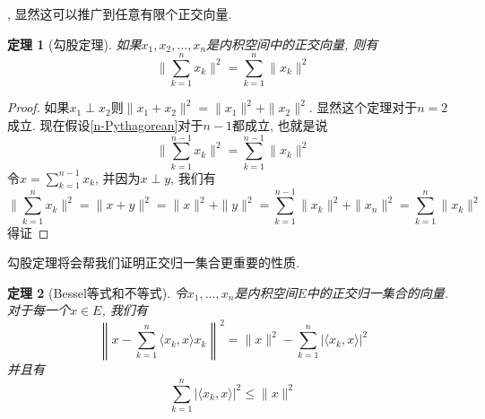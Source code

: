 \documentclass[a4paper,11pt]{article}
\newtheorem{theorem}{\hspace{2em}定理}[section]
\newtheorem{proof}{证明}[section]
\begin{document}
, 显然这可以推广到任意有限个正交向量.
\begin{theorem}[勾股定理]
  如果$x_1,x_2,\dots,x_n$是内积空间中的正交向量, 则有
  \begin{equation*}\label{n-Pythagorean}
    \|\sum_{k=1}^{n}x_k\|^2=\sum_{k=1}^{n}\|x_k\|^2
  \end{equation*}
\end{theorem}
\begin{proof}
  如果$x_1\perp x_2$则$\|x_1+x_2\|^2=\|x_1\|^2+\|x_2\|^2$. 显然这个定理对于$n=2$成立. 现在假设\eqref{n-Pythagorean}对于$n-1$都成立, 也就是说
  \begin{equation*}
    \|\sum_{k=1}^{n-1}x_k\|^2=\sum_{k=1}^{n-1}\|x_k\|^2
  \end{equation*}
  令$x=\sum_{k=1}^{n-1}x_k$, 并因为$x\perp y$, 我们有
  \begin{equation*}
    \|\sum_{k=1}^{n}x_k\|^2=\|x+y\|^2=\|x\|^2+\|y\|^2=\sum_{k=1}^{n-1}\|x_k\|^2+\|x_n\|^2=\sum_{k=1}^{n}\|x_k\|^2
  \end{equation*}
  得证
\end{proof}
勾股定理将会帮我们证明正交归一集合更重要的性质.
\begin{theorem}[Bessel等式和不等式]
  令$x_1,\dots,x_n$是内积空间$E$中的正交归一集合的向量. 对于每一个$x\in E$, 我们有
  \begin{equation}\label{Bessel neq}
    \left\|x-\sum_{k=1}^{n}\langle x_k,x\rangle x_k\right\|^2=\|x\|^2-\sum_{k=1}^{n}|\langle x_k,x\rangle|^2
  \end{equation}
  并且有
  \begin{equation*}
    \sum_{k=1}^{n}|\langle x_k,x\rangle|^2\leq\|x\|^2
  \end{equation*}
\end{theorem}
\end{document}
